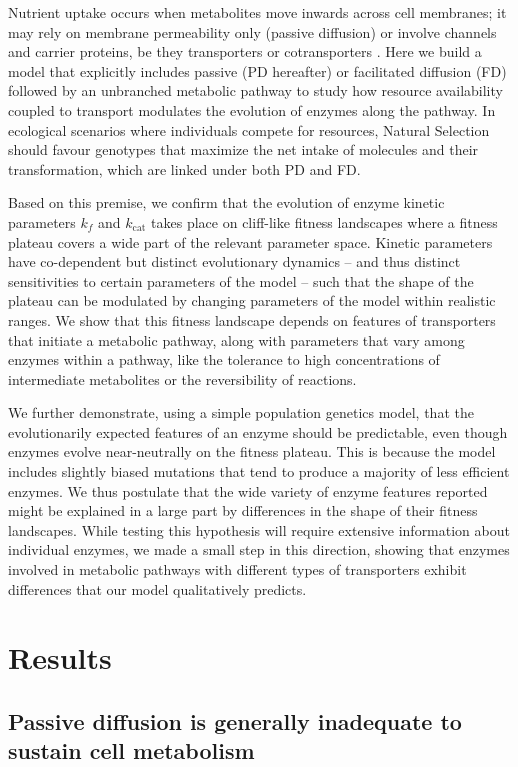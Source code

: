 \documentclass[11pt,onecolumn]{article}
\begin{document}
Nutrient uptake occurs when metabolites move inwards across cell membranes; it may rely on membrane permeability only (passive diffusion) or involve channels and carrier proteins, be they transporters or cotransporters \citep{Stein86a}.
Here we build a model that explicitly includes passive (PD hereafter) or facilitated diffusion (FD) followed by an unbranched metabolic pathway to study how resource availability coupled to transport modulates the evolution of enzymes along the pathway.
In ecological scenarios where individuals compete for resources, Natural Selection should favour genotypes that maximize the net intake of molecules and their transformation, which are linked under both PD and FD.

Based on this premise, we confirm that the evolution of enzyme kinetic parameters $k_f$ and $k_\text{cat}$ takes place on cliff-like fitness landscapes where a fitness plateau covers a wide part of the relevant parameter space. Kinetic parameters have co-dependent but distinct evolutionary dynamics -- and thus distinct sensitivities to certain parameters of the model -- such that the shape of the plateau can be modulated by changing parameters of the model within realistic ranges. We show that this fitness landscape depends on features of transporters that initiate a metabolic pathway, along with parameters that vary among enzymes within a pathway, like the tolerance to high concentrations of intermediate metabolites or the reversibility of reactions.

We further demonstrate, using a simple population genetics model, that the evolutionarily expected features of an enzyme should be predictable, even though enzymes evolve near-neutrally on the fitness plateau. This is because the model includes slightly biased mutations that tend to produce a majority of less efficient enzymes. We thus postulate that the wide variety of enzyme features reported might be explained in a large part by differences in the shape of their fitness landscapes. While testing this hypothesis will require extensive information about individual enzymes, we made a small step in this direction, showing that enzymes involved in metabolic pathways with different types of transporters exhibit differences that our model qualitatively predicts.  

\section{Results\label{sec:Results}}

\subsection{Passive diffusion is generally inadequate to sustain cell metabolism}
\end{document}
